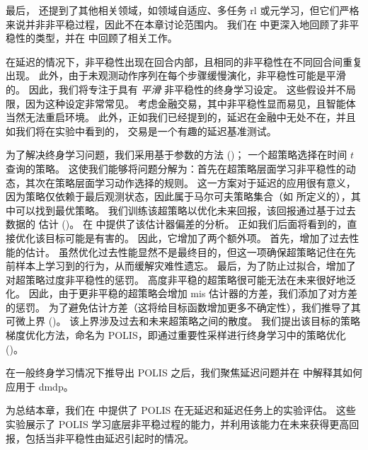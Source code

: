最后，\cite{khetarpal2020towards} 还提到了其他相关领域，如领域自适应、多任务 \gls{rl} 或元学习，但它们严格来说并非非平稳过程，因此不在本章讨论范围内。
我们在  中更深入地回顾了非平稳性的类型，并在  中回顾了相关工作。

在延迟的情况下，非平稳性出现在回合内部，且相同的非平稳性在不同回合间重复出现。
此外，由于未观测动作序列在每个步骤缓慢演化，非平稳性可能是平滑的。
因此，我们将专注于具有 \emph{平滑} 非平稳性的终身学习设定。
这些假设并不局限，因为这种设定非常常见。
考虑金融交易，其中非平稳性显而易见，且智能体当然无法重启环境。
此外，正如我们已经提到的，延迟在金融中无处不在，并且如我们将在实验中看到的，
交易是一个有趣的延迟基准测试。

为了解决终身学习问题，我们采用基于参数的方法 ()；
一个超策略选择在时间 $t$ 查询的策略。
这使我们能够将问题分解为：首先在超策略层面学习非平稳性的动态，其次在策略层面学习动作选择的规则。
这一方案对于延迟的应用很有意义，因为策略仅依赖于最后观测状态，因此属于马尔可夫策略集合（如 \cite[Theorem~5.1]{derman2021acting} 所定义的），其中可以找到最优策略。
我们训练该超策略以优化未来回报，该回报通过基于过去数据的  估计 ()。
在  中提供了该估计器偏差的分析。
正如我们后面将看到的，直接优化该目标可能是有害的。
因此，它增加了两个额外项。
首先，增加了过去性能的估计。
虽然优化过去性能显然不是最终目的，但这一项确保超策略记住在先前样本上学习到的行为，从而缓解灾难性遗忘。
最后，为了防止过拟合，增加了对超策略过度非平稳性的惩罚。
高度非平稳的超策略很可能无法在未来很好地泛化。
因此，由于更非平稳的超策略会增加 \gls{mis} 估计器的方差，我们添加了对方差的惩罚。
为了避免估计方差（这将给目标函数增加更多不确定性），我们推导了其可微上界 ()。
该上界涉及过去和未来超策略之间的散度。
我们提出该目标的策略梯度优化方法，命名为 POLIS，即通过重要性采样进行终身学习中的策略优化 ()。

在一般终身学习情况下推导出 POLIS 之后，我们聚焦延迟问题并在  中解释其如何应用于 \gls{dmdp}。

为总结本章，我们在  中提供了 POLIS 在无延迟和延迟任务上的实验评估。
这些实验展示了 POLIS 学习底层非平稳过程的能力，并利用该能力在未来获得更高回报，包括当非平稳性由延迟引起时的情况。






